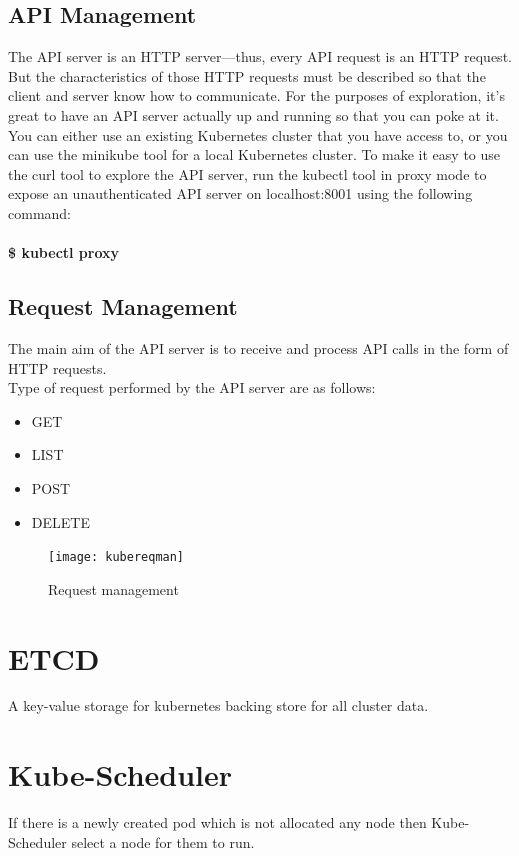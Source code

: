 \documentclass[12pt]{report}
\begin{document}
\subsection{API Management \cite{KubernetesManagement}}
The API server is an HTTP server—thus, every API request is an HTTP request. But the characteristics of those HTTP requests must be described so that the client and server know how to communicate. For the purposes of exploration, it’s great to have an API server actually up and running so that you can poke at it. You can either use an existing Kubernetes cluster that you have access to, or you can use the minikube tool for a local Kubernetes cluster. To make it easy to use the curl tool to explore the API server, run the kubectl tool in proxy mode to expose an unauthenticated API server on localhost:8001 using the following command:\\\\
\textbf{\$ kubectl proxy}
\subsection{Request Management}
The main aim of the API server is to receive and process API calls in the form of HTTP requests.\\
Type of request performed by the API server are as follows:
\begin{itemize}
	\item GET
	\item LIST
	\item POST
	\item DELETE
\end{itemize}
\begin{figure}[h!]
	\begin{center}
		\texttt{[image: kubereqman]}
		\caption{Request management \cite{Request}}
	\end{center}
\end{figure}
\section{ETCD}
A key-value storage for kubernetes backing store for all cluster data.
\section{Kube-Scheduler}
If there is a newly created pod which is not allocated any node then Kube-Scheduler select a node for them to run.
\end{document}
